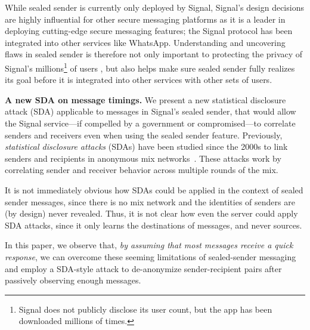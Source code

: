 While sealed sender is currently only deployed by Signal, Signal's design decisions
are highly influential for other secure messaging platforms as it is a leader in 
deploying cutting-edge secure messaging features; the Signal protocol has 
been integrated into other services like WhatsApp.  Understanding and  uncovering flaws
in sealed sender is therefore not only important to protecting the privacy of Signal's
millions\footnote{Signal does not publicly disclose its user count, but the app has been downloaded millions of times.}
 of users \cite{signalusercount}, but also helps make sure sealed sender fully realizes
its goal before it is integrated into other services with other sets of users.

\medskip
\noindent
\textbf{A new SDA on message timings.}
We present a new statistical disclosure attack (SDA) applicable to messages in Signal's sealed sender, that
would allow the Signal service---if compelled by a government or compromised---to correlate
senders and receivers even when using the sealed sender feature.
Previously,
\emph{statistical disclosure
attacks} (SDAs) have been studied since the 2000s to
link senders and recipients in anonymous mix
networks~\cite{SDA,SDA-MD05,LSDA,two-sided-SDA,reverse-SDA}.
These attacks work by correlating sender and receiver behavior across multiple rounds of the mix.


It is not immediately obvious how SDAs could be applied in the context
of sealed sender messages, since there is no mix network and the identities of
senders are (by design) never revealed. Thus, it is not clear how even the server
could apply SDA attacks, since it only learns the destinations of messages, and
never sources.


In this paper, we observe that, \emph{by assuming that most messages
receive a quick response}, we can overcome these seeming limitations of
sealed-sender messaging and employ a SDA-style attack to
de-anonymize sender-recipient pairs after passively observing enough messages.

